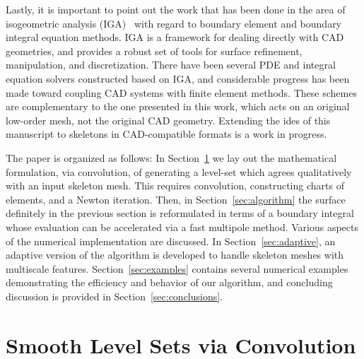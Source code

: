 \documentclass[11pt]{article}
\numberwithin{equation}{section}
\begin{document}
Lastly, it is important to point out the work that has been done in
the area of isogeometric analysis
(IGA)~\cite{cottrell,hughes2005isogeometric,simpson2014acoustic} with
regard to boundary element and boundary integral equation methods. IGA
is a framework for dealing directly with CAD geometries, and provides
a robust set of tools for surface refinement, manipulation, and
discretization. There have been several PDE and integral equation
solvers constructed based on IGA, and considerable progress has been
made toward coupling CAD systems with finite element methods. These
schemes are complementary to the one presented in this work, which
acts on an original low-order mesh, not the original CAD
geometry. Extending the ides of this manuscript to skeletons in
CAD-compatible formats is a work in progress.

The paper is organized as follows: In Section~\ref{sec:smooth} we lay
out the mathematical formulation, via convolution, of generating a
level-set which agrees qualitatively with an input skeleton mesh. This
requires convolution, constructing charts of elements, and a Newton
iteration.  Then, in Section~\ref{sec:algorithm} the surface
definitely in the previous section is reformulated in terms of a
boundary integral whose evaluation can be accelerated via a fast
multipole method.  Various aspects of the numerical implementation are
discussed. In Section~\ref{sec:adaptive}, an adaptive version of the
algorithm is developed to handle skeleton meshes with multiscale
features.  Section~\ref{sec:examples} contains several numerical
examples demonstrating the efficiency and behavior of our algorithm,
and concluding discussion is provided in
Section~\ref{sec:conclusions}.


\section{Smooth Level Sets via Convolution}
\label{sec:smooth}
\end{document}
